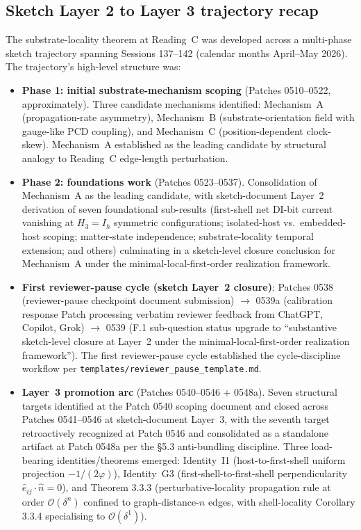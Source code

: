 \documentclass[11pt,letterpaper]{article}
\newcommand{\phig}{\varphi}
\newcommand{\bigO}[1]{\mathcal{O}(#1)}
\begin{document}
\subsection{Sketch Layer 2 to Layer 3 trajectory recap}
\label{sec:trajectory-recap}

The substrate-locality theorem at Reading~C was developed across a multi-phase sketch trajectory spanning Sessions 137--142 (calendar months April--May 2026). The trajectory's high-level structure was:

\begin{itemize}[leftmargin=2em]
\item \textbf{Phase 1: initial substrate-mechanism scoping} (Patches 0510--0522, approximately). Three candidate mechanisms identified: Mechanism~A (propagation-rate asymmetry), Mechanism~B (substrate-orientation field with gauge-like PCD coupling), and Mechanism~C (position-dependent clock-skew). Mechanism~A established as the leading candidate by structural analogy to Reading~C edge-length perturbation.
\item \textbf{Phase 2: foundations work} (Patches 0523--0537). Consolidation of Mechanism~A as the leading candidate, with sketch-document Layer~2 derivation of seven foundational sub-results (first-shell net DI-bit current vanishing at $H_3 = I_h$ symmetric configurations; isolated-host vs.\ embedded-host scoping; matter-state independence; substrate-locality temporal extension; and others) culminating in a sketch-level closure conclusion for Mechanism~A under the minimal-local-first-order realization framework.
\item \textbf{First reviewer-pause cycle (sketch Layer~2 closure)}: Patches 0538 (reviewer-pause checkpoint document submission) $\to$ 0539a (calibration response Patch processing verbatim reviewer feedback from ChatGPT, Copilot, Grok) $\to$ 0539 (F.1 sub-question status upgrade to ``substantive sketch-level closure at Layer~2 under the minimal-local-first-order realization framework''). The first reviewer-pause cycle established the cycle-discipline workflow per \texttt{templates/reviewer\_pause\_template.md}.
\item \textbf{Layer~3 promotion arc} (Patches 0540--0546 + 0548a). Seven structural targets identified at the Patch 0540 scoping document and closed across Patches 0541--0546 at sketch-document Layer~3, with the seventh target retroactively recognized at Patch 0546 and consolidated as a standalone artifact at Patch 0548a per the \S5.3 anti-bundling discipline. Three load-bearing identities/theorems emerged: Identity~I1 (host-to-first-shell uniform projection $-1/(2\phig)$), Identity~G3 (first-shell-to-first-shell perpendicularity $\hat{e}_{ij} \cdot \hat{n} = 0$), and Theorem 3.3.3 (perturbative-locality propagation rule at order $\bigO{\delta^n}$ confined to graph-distance-$n$ edges, with shell-locality Corollary 3.3.4 specialising to $\bigO{\delta^1}$).

\end{itemize}
\end{document}
